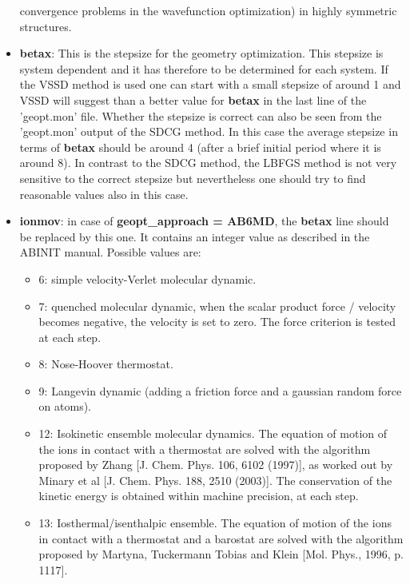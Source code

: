 \documentclass[a4paper,11pt]{report}
\begin{document}
\begin{itemize}
                        convergence problems in the wavefunction optimization) in highly symmetric structures.
\item  {\bf betax}: This is the stepsize for the geometry optimization. This stepsize is system dependent and it has therefore to be 
                      determined for each system. If the VSSD method is used one can start with a small stepsize of around 1 and 
                      VSSD will suggest than a better value for {\bf betax} in the last line of the 'geopt.mon' file. 
                      Whether the stepsize is correct can also be seen from the 'geopt.mon' output of the SDCG method. In this 
                      case the average stepsize in terms of \textbf{betax} should be around 4 (after a brief initial period where it is around 8).
                      In contrast to the SDCG method, the LBFGS method is not very sensitive to the correct stepsize but nevertheless 
                      one should try to find reasonable values also in this case.
\item  \textbf{ionmov}: in case of {\bf geopt\_approach = AB6MD}, the {\bf betax} line should be replaced by this one. It contains an integer value as described in the ABINIT manual. Possible values are:
                         \begin{itemize}
                         \item 6: simple velocity-Verlet molecular dynamic.
                         \item 7: quenched molecular dynamic, when the scalar product force / velocity becomes negative, the velocity is set to zero. The force criterion is tested at each step.
                         \item 8: Nose-Hoover thermostat.
                         \item 9: Langevin dynamic (adding a friction force and a gaussian random force on atoms).
                         \item 12: Isokinetic ensemble molecular dynamics. The equation of motion of the ions in contact with a thermostat are solved with the algorithm proposed by Zhang [J. Chem. Phys. 106, 6102 (1997)], as worked out by Minary et al [J. Chem. Phys. 188, 2510 (2003)]. The conservation of the kinetic energy is obtained within machine precision, at each step.
                         \item 13: Iosthermal/isenthalpic ensemble. The equation of motion of the ions in contact with a thermostat and a barostat are solved with the algorithm proposed by Martyna, Tuckermann Tobias and Klein [Mol. Phys., 1996, p. 1117].

\end{itemize}
\end{itemize}
\end{document}
